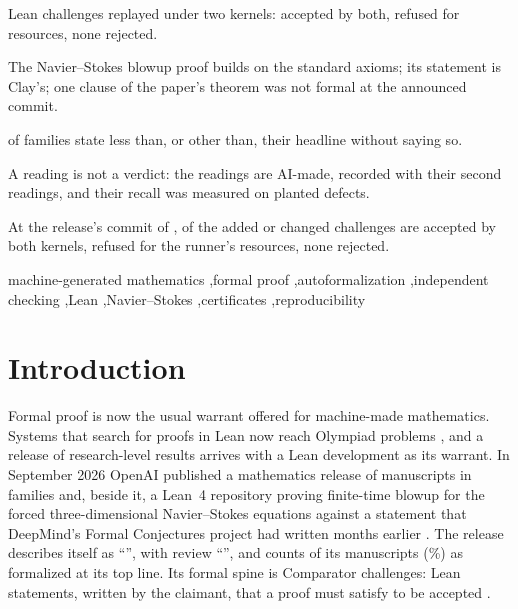 \documentclass[preprint,11pt,authoryear,a4paper]{elsarticle}
\begin{document}
\begin{frontmatter}
\begin{highlights}
\item \MtOaChallenges{} Lean challenges replayed under two kernels: \MtOaCertified{} accepted by both, \MtOaRefused{} refused for resources, none rejected.
\item The Navier--Stokes blowup proof builds on the standard axioms; its statement is Clay's; one clause of the paper's theorem was not formal at the announced commit.
\item \MtOaShort{} of \MtOaStatements{} families state less than, or other than, their headline without saying so.
\item A reading is not a verdict: the readings are AI-made, recorded with their second readings, and their recall was measured on planted defects.
\item At the release's commit of \OmNextDate{}, \OmTwoCertified{} of the \OmTwoMembers{} added or changed challenges are accepted by both kernels, \OmTwoRefusedWord{} refused for the runner's resources, none rejected.
\end{highlights}

\begin{keyword}
machine-generated mathematics \sep formal proof \sep autoformalization \sep independent checking \sep Lean \sep Navier--Stokes \sep certificates \sep reproducibility
\end{keyword}

\end{frontmatter}

\section{Introduction}\label{sec:intro}

Formal proof is now the usual warrant offered for machine-made mathematics. Systems that search for proofs in Lean now reach Olympiad problems \citep{AlphaProof25,DeepSeekProverV2,Kimina25,Goedel25}, and a release of research-level results arrives with a Lean development as its warrant. In September 2026 OpenAI published a mathematics release of \MtOaManuscripts{} manuscripts in \MtOaFamilies{} families \citep{OpenAIMath} and, beside it, a Lean~4 repository proving finite-time blowup for the forced three-dimensional Navier--Stokes equations against a statement that DeepMind's Formal Conjectures project had written months earlier \citep{OpenAINS,FormalConjectures}. The release describes itself as ``\MtOaStatedScope'', with review ``\MtOaStatedReview'', and counts \MtOaStatedFormalized{} of its \MtOaManuscripts{} manuscripts (\MtOaStatedPercent\%) as formalized at its top line. Its formal spine is \MtOaChallenges{} Comparator challenges: Lean statements, written by the claimant, that a proof must satisfy to be accepted \citep{Comparator}.
\end{document}
